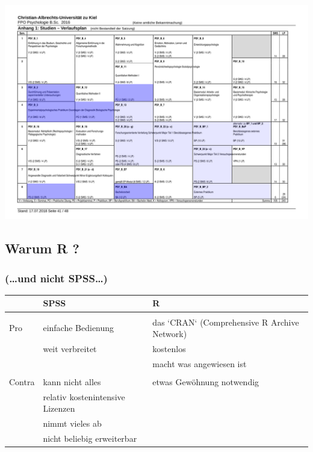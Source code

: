 \documentclass[
]{book}
\begin{document}
\begin{center}\includegraphics[width=0.8\linewidth]{imgs/relevanz} \end{center}

\hypertarget{warum-r}{%
\subsection*{Warum R ?}\label{warum-r}}

\hypertarget{und-nicht-spss}{%
\subsubsection*{(\ldots und nicht SPSS\ldots)}\label{und-nicht-spss}}

\begin{table}[H]
\centering
\begin{tabular}[t]{l|l|l}
\hline
  & SPSS & R\\
\hline
 &  & \\
\hline
Pro & einfache Bedienung & das `CRAN` (Comprehensive R Archive Network)\\
\hline
 & weit verbreitet & kostenlos\\
\hline
 &  & macht was angewiesen ist\\
\hline
 &  & \\
\hline
Contra & kann nicht alles & etwas Gewöhnung notwendig\\
\hline
 & relativ kostenintensive Lizenzen & \\
\hline
 & nimmt vieles ab & \\
\hline
 & nicht beliebig erweiterbar & \\
\hline
\end{tabular}
\end{table}
\end{document}
